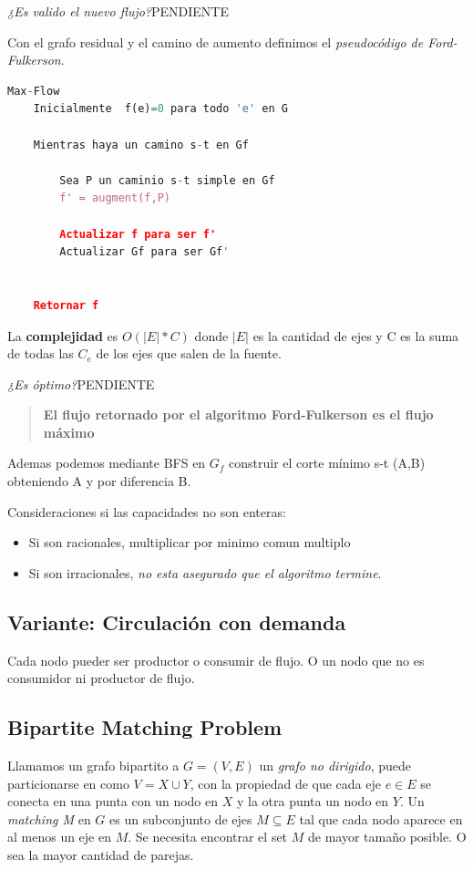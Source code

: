 \documentclass{article}
\begin{document}
\textit{¿Es valido el nuevo flujo?}PENDIENTE

Con el grafo residual y el camino de aumento definimos el \textit{pseudocódigo de Ford-Fulkerson}.


\begin{lstlisting}[language=Python, caption=Operación de augment]
Max-Flow
    Inicialmente  f(e)=0 para todo 'e' en G

    Mientras haya un camino s-t en Gf

        Sea P un caminio s-t simple en Gf
        f' = augment(f,P)

        Actualizar f para ser f'
        Actualizar Gf para ser Gf'


    Retornar f
\end{lstlisting}

La \textbf{complejidad} es \(O(|E|*C)\) donde \(|E|\) es la cantidad de ejes y C es la suma de todas
las \(C_e\) de los ejes que salen de la fuente.


\textit{¿Es óptimo?}PENDIENTE

\begin{quote}
    \textbf{El flujo retornado por el algoritmo Ford-Fulkerson es el flujo máximo}
\end{quote}

Ademas podemos mediante BFS en \(G_f\) construir el corte mínimo s-t (A,B) obteniendo A y por diferencia B.

Consideraciones si las capacidades no son enteras:
\begin{itemize}
    \item Si son racionales, multiplicar por minimo comun multiplo
    \item Si son irracionales, \textit{no esta asegurado que el algoritmo termine}.
\end{itemize}

\subsection{Variante: Circulación con demanda}

Cada nodo pueder ser productor o consumir de flujo. O un nodo que no es consumidor ni productor de flujo.

\newpage
\subsection{Bipartite Matching Problem}

Llamamos un grafo bipartito a \(G=(V,E)\) un \textit{grafo no dirigido}, puede particionarse en 
como \(V=X \cup Y\), con la propiedad de que cada eje \(e \in E\) se conecta en una punta con
un nodo en \(X\) y la otra punta un nodo en \(Y\). Un \textit{matching M} en \(G\) es un subconjunto
de ejes \(M \subseteq E\) tal que cada nodo aparece en al menos un eje en \(M\).
Se necesita encontrar el set \(M\) de mayor tamaño posible. O sea la mayor cantidad de parejas.
\end{document}
